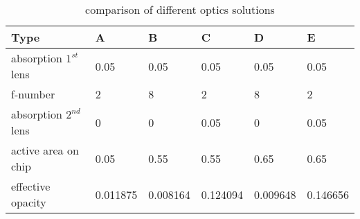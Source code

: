 \begin{table}[H]
\centering
\caption{comparison of different optics solutions}
\label{tab:receiver_optics}
\begin{tabular}{|l|lllll|}\hline
\textbf{Type}                & \textbf{A}        & \textbf{B}        & \textbf{C}        & \textbf{D}        & \textbf{E}        \\ \hline
absorption $1^{st}$ lens & 0.05     & 0.05     & 0.05     & 0.05     & 0.05     \\
f-number                 & 2        & 8        & 2        & 8        & 2        \\
absorption $2^{nd}$ lens & 0        & 0        & 0.05     & 0        & 0.05     \\
active area on chip      & 0.05     & 0.55     & 0.55     & 0.65     & 0.65     \\ \hline
effective opacity            & 0.011875 & 0.008164 & 0.124094 & 0.009648 & 0.146656 \\ \hline
\end{tabular}
\end{table}
